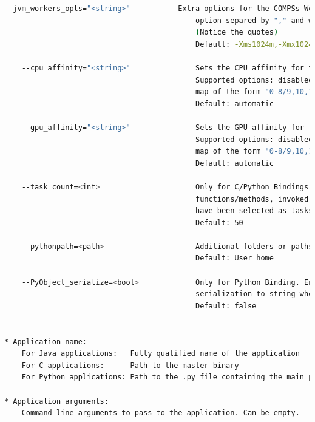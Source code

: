 \begin{lstlisting}[language=bash]
    --jvm_workers_opts="<string>"           Extra options for the COMPSs Workers JVMs. Each 
                                            option separed by "," and without blank spaces 
                                            (Notice the quotes)
                                            Default: -Xms1024m,-Xmx1024m,-Xmn400m
                                            
    --cpu_affinity="<string>"               Sets the CPU affinity for the workers
                                            Supported options: disabled, automatic, user defined
                                            map of the form "0-8/9,10,11/12-14,15,16"
                                            Default: automatic
                                            
    --gpu_affinity="<string>"               Sets the GPU affinity for the workers
                                            Supported options: disabled, automatic, user defined
                                            map of the form "0-8/9,10,11/12-14,15,16"
                                            Default: automatic
                                            
    --task_count=<int>                      Only for C/Python Bindings. Maximum number of different
                                            functions/methods, invoked from the application, that 
                                            have been selected as tasks
                                            Default: 50
                                            
    --pythonpath=<path>                     Additional folders or paths to add to the PYTHONPATH
                                            Default: User home
                                            
    --PyObject_serialize=<bool>             Only for Python Binding. Enable the object 
                                            serialization to string when possible (true/false).
                                            Default: false


* Application name:
    For Java applications:   Fully qualified name of the application
    For C applications:      Path to the master binary
    For Python applications: Path to the .py file containing the main program

* Application arguments:
    Command line arguments to pass to the application. Can be empty.                                         
\end{lstlisting}

